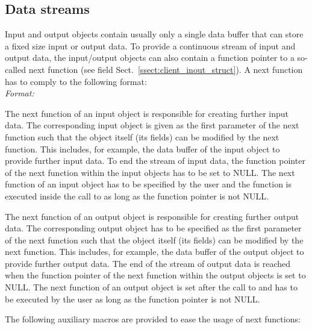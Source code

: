 \subsection{Data streams}
\label{ssect:client_inout_stream}

Input and output objects contain usually only a single data buffer that can store a fixed size input or output data.
To provide a continuous stream of input and output data, the input/output objects can also contain a function pointer to a so-called next function (see field  Sect.~\ref{ssect:client_inout_struct}).
A next function has to comply to the following format:\\
\textit{Format:} 

The next function of an input object is responsible for creating further input data.
The corresponding input object is given as the first parameter of the next function such that the object itself (\ie its fields) can be modified by the next function.
This includes, for example, the data buffer of the input object to provide further input data.
To end the stream of input data, the function pointer of the next function within the input objects has to be set to NULL.
The next function of an input object has to be specified by the user and the function is executed inside the call to  as long as the function pointer is not NULL.

The next function of an output object is responsible for creating further output data.
The corresponding output object has to be specified as the first parameter of the next function such that the object itself (\ie its fields) can be modified by the next function.
This includes, for example, the data buffer of the output object to provide further output data.
The end of the stream of output data is reached when the function pointer of the next function within the output objects is set to NULL.
The next function of an output object is set after the call to  and has to be executed by the user as long as the function pointer is not NULL.

The following auxiliary macros are provided to ease the usage of next functions:\\

